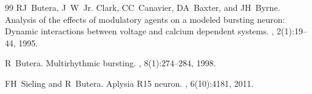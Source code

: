 \documentclass[nofootinbib,aip,amsmath,amssymb,reprint,twocolumn,10pt]{revtex4-2}
\begin{document}
\begin{thebibliography}{99}
RJ~Butera, J~W~Jr. Clark, CC~Canavier, DA~Baxter, and JH~Byrne.
\newblock Analysis of the effects of modulatory agents on a modeled bursting
  neuron: Dynamic interactions between voltage and calcium dependent systems.
, 2(1):19--44, 1995.

R~Butera.
\newblock Multirhythmic bursting.
, 8(1):274--284, 1998.

FH~Sieling and R~Butera.
\newblock Aplysia {R}15 neuron.
, 6(10):4181, 2011.

\end{thebibliography}
\end{document}
